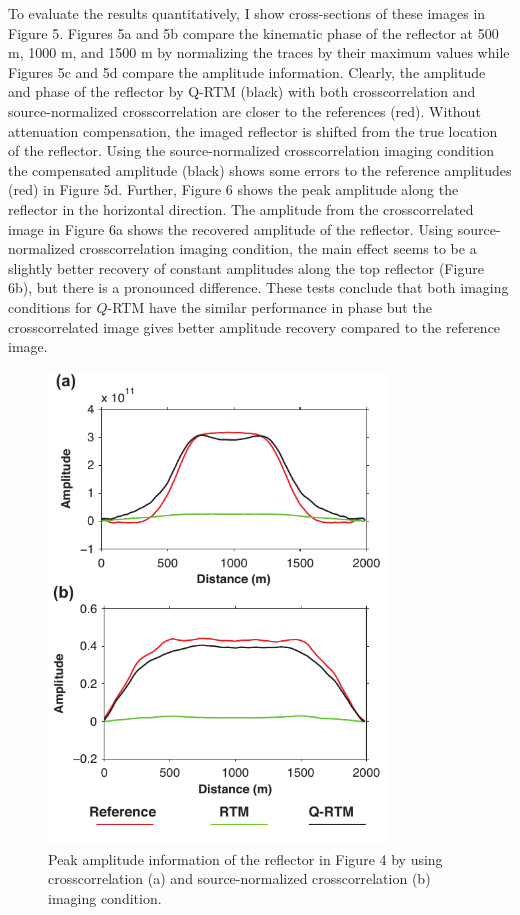 To evaluate the results quantitatively, I show cross-sections of these images in Figure 5. Figures 5a and 5b compare the kinematic phase of the reflector at 500 m, 1000 m, and 1500 m by normalizing the traces by their maximum values while Figures 5c and 5d compare the amplitude information. Clearly, the amplitude and phase of the reflector by Q-RTM (black) with both crosscorrelation and source-normalized crosscorrelation are closer to the references (red). Without attenuation compensation, the imaged reflector is shifted from the true location of the reflector. Using the source-normalized crosscorrelation imaging condition the compensated amplitude (black) shows some errors to the reference amplitudes (red) in Figure 5d.
Further, Figure 6 shows the peak amplitude along the reflector in the horizontal direction. The amplitude from the crosscorrelated image in Figure 6a shows the recovered amplitude of the reflector. Using source-normalized crosscorrelation imaging condition, the main effect seems to be a slightly better recovery of constant amplitudes along the top reflector (Figure 6b), but there is a pronounced difference. These tests conclude that both imaging conditions for $Q$-RTM have the similar performance in phase but the crosscorrelated image gives better amplitude recovery compared to the reference image. 

 \begin{figure}[!htb]
   \centering
   \includegraphics[width=0.8\textwidth]{Fig/fig6-eps-converted-to}
   \caption{Peak amplitude information of the reflector in Figure 4 by using crosscorrelation (a) and source-normalized crosscorrelation (b) imaging condition. }
 \end{figure}

